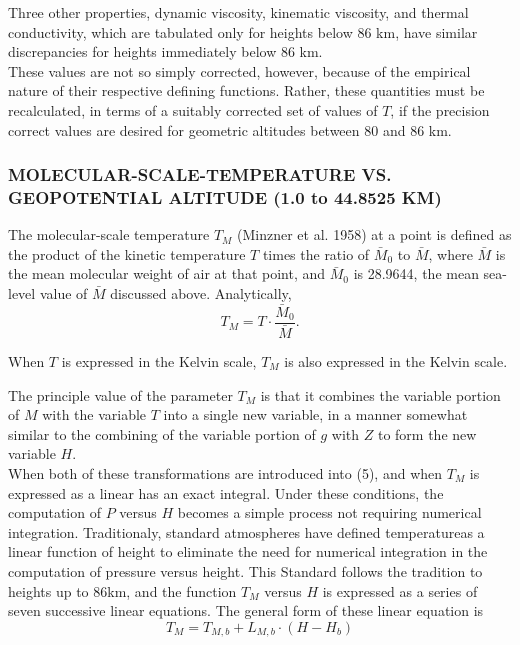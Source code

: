 \documentclass{article}
\begin{document}
Three other properties, dynamic viscosity, kinematic viscosity, and thermal conductivity, which are tabulated only for heights below 86 km, have similar discrepancies for heights immediately below 86 km.\\

These values are not so simply corrected, however, because of the empirical nature of their respective defining functions. Rather, these quantities must be recalculated, in terms of a suitably corrected set of values of $T$, if the precision correct values are desired for geometric altitudes between 80 and 86 km.\\

\subsubsection{MOLECULAR-SCALE-TEMPERATURE VS. GEOPOTENTIAL ALTITUDE (1.0 to 44.8525 KM)}

The molecular-scale temperature $T_M$ (Minzner et al. 1958) at a point is defined as the product of the kinetic temperature $T$ times the ratio of $\bar{M}_0$ to $\bar{M}$, where $\bar{M}$ is the mean molecular weight of air at that point, and $\bar{M}_0$ is 28.9644, the mean sea-level value of $\bar{M}$ discussed above. Analytically,
\begin{equation}
  T_M = T \cdot \frac{\bar{M}_0}{\bar{M}}. \tag{22}
\end{equation}

When $T$ is expressed in the Kelvin scale, $T_M$ is also expressed in the Kelvin scale.

The principle value of the parameter $T_M$ is that it combines the variable portion of $M$ with the variable $T$ into a single new variable, in a manner somewhat similar to the combining of the variable portion of $g$ with $Z$ to form the new variable $H$.\\
When both of these transformations are introduced into (5), and when $T_M$ is expressed as a linear has an exact integral. Under these conditions, the computation of $P$ versus $H$ becomes a simple process not requiring numerical integration. Traditionaly, standard atmospheres have defined temperatureas a linear function of height to eliminate the need for numerical integration in the computation of pressure versus height. This Standard follows the tradition to heights up to 86km, and the function $T_M$ versus $H$ is expressed as a series of seven successive linear equations. The general form of these linear equation is 
\begin{equation}
  T_M = T_{M,b} + L_{M,b}\cdot (H - H_b) 
  \tag{23}
\end{equation}
\end{document}
